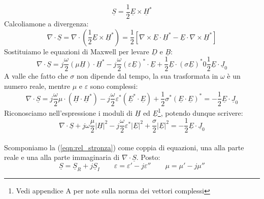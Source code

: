 \documentclass{book}
\begin{document}
        \begin{equation}
            \underline{S}=\frac{1}{2}\underline{E} \times \underline{H}^{*}
        \end{equation}
        Calcoliamone a divergenza:
        \begin{equation}
            \nabla \cdot \underline{S} = \nabla \cdot (\frac{1}{2}\underline{E} \times \underline{H}^{*}) = \frac{1}{2}[\nabla \times \underline{E} \cdot \underline{H}^{*}- \underline{E} \cdot \nabla \times \underline{H}^{*}]
        \end{equation}
        Sostituiamo le equazioni di Maxwell per levare $\underline{D}$ e $\underline{B}$:
        \begin{equation}
            \nabla \cdot \underline{S} = j \frac{\omega}{2}(\mu \underline{H}) \cdot \underline{H}^{*}-j \frac{\omega}{2}(\varepsilon \underline{E})^{*}\cdot \underline{E} + \frac{1}{2}\underline{E} \cdot (\sigma \underline{E})^{*} 0 \frac{1}{2}\underline{E} \cdot \underline{J}_{0} 
        \end{equation}
        A valle che fatto che $\sigma$ non dipende dal tempo, la sua trasformata in $\omega$ è un numero reale, mentre $\mu$ e $\varepsilon$ sono complessi:
        \begin{equation}
            \nabla \cdot \underline{S} = j \frac{\omega}{2}\mu\cdot  (\underline{H} \cdot \underline{H}^{*})-j \frac{\omega}{2}\varepsilon^{*} (\underline{E}^{*}\cdot \underline{E}) + \frac{1}{2}\sigma^{*}(\underline{E} \cdot  \underline{E})^{*} = -\frac{1}{2} \underline{E}\cdot \underline{J}_{0}
        \end{equation}
        Riconosciamo nell'espressione i moduli di $\underline{H} $ ed $ \underline{E}$\footnote{Vedi appendice A per note sulla norma dei vettori complessi}, potendo dunque scrivere:
        \begin{equation}
        \label{eqn:rel_stronza}
            \nabla \cdot \underline{S} +j \omega \frac{\mu}{2}|\underline{H}|^{2}-j \frac{\omega}{2}\varepsilon^{*}|\underline{E}|^{2}+\frac{\sigma}{2}|\underline{E}|^{2}=-\frac{1}{2}\underline{E} \cdot \underline{J}_{0}
        \end{equation} \\
        Scomponiamo la (\ref{eqn:rel_stronza}) come coppia di equazioni, una alla parte reale e una alla parte immaginaria di $\nabla \cdot \underline{S}$. Posto:
        \begin{equation}
            \underline{S}=\underline{S}_{R}+j\underline{S}_{I} \qquad \varepsilon=\varepsilon'-j\varepsilon'' \qquad \mu = \mu'-j\mu''
        \end{equation}
\end{document}
